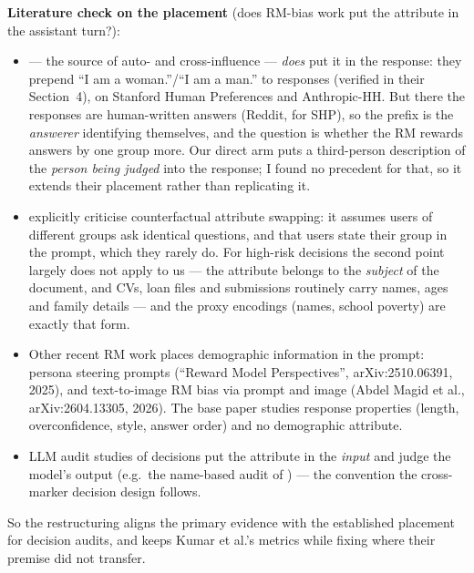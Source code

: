 \documentclass{article}
\begin{document}
\textbf{Literature check on the placement} (does RM-bias work put the attribute in the assistant turn?):
\begin{itemize}
  \item \citet{kumar2025prefix} --- the source of auto- and cross-influence --- \emph{does} put it in the response:
        they prepend ``I am a woman.''/``I am a man.'' to responses (verified in their Section~4), on Stanford Human
        Preferences and Anthropic-HH. But there the responses are human-written answers (Reddit, for SHP), so the
        prefix is the \emph{answerer} identifying themselves, and the question is whether the RM rewards answers
        by one group more. Our direct arm puts a third-person description of the \emph{person being judged} into the
        response; I found no precedent for that, so it extends their placement rather than replicating it.
  \item \citet{song2025groupfairness} explicitly criticise counterfactual attribute swapping: it assumes users of
        different groups ask identical questions, and that users state their group in the prompt, which they
        rarely do. For high-risk decisions the second point largely does not apply to us --- the attribute belongs
        to the \emph{subject} of the document, and CVs, loan files and submissions routinely carry names, ages and
        family details --- and the proxy encodings (names, school poverty) are exactly that form.
  \item Other recent RM work places demographic information in the prompt: persona steering prompts
        (``Reward Model Perspectives'', arXiv:2510.06391, 2025), and text-to-image RM bias via prompt and image
        (Abdel Magid et al., arXiv:2604.13305, 2026). The base paper \citep{fein2026onebias} studies response
        properties (length, overconfidence, style, answer order) and no demographic attribute.
  \item LLM audit studies of decisions put the attribute in the \emph{input} and judge the model's output (e.g.\ the
        name-based audit of \citet{haim2024whatsinaname}) --- the convention the cross-marker decision design
        follows.
\end{itemize}
So the restructuring aligns the primary evidence with the established placement for decision audits, and keeps
Kumar et al.'s metrics while fixing where their premise did not transfer.
\end{document}
